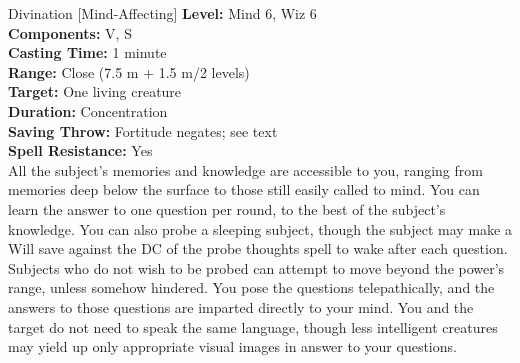 {Divination [Mind-Affecting]}
{
	\textbf{Level:} Mind 6, Wiz 6\\
	\textbf{Components:} V, S\\
	\textbf{Casting Time:} 1 minute\\
	\textbf{Range:} Close (7.5 m + 1.5 m/2 levels)\\
	\textbf{Target:} One living creature\\
	\textbf{Duration:} Concentration\\
	\textbf{Saving Throw:} Fortitude negates; see text\\
	\textbf{Spell Resistance:} Yes\\
}
{
	All the subject's memories and knowledge are accessible to you, ranging from memories deep below the surface to those still easily called to mind. You can learn the answer to one question per round, to the best of the subject's knowledge. You can also probe a sleeping subject, though the subject may make a Will save against the DC of the probe thoughts spell to wake after each question. Subjects who do not wish to be probed can attempt to move beyond the power's range, unless somehow hindered. You pose the questions telepathically, and the answers to those questions are imparted directly to your mind. You and the target do not need to speak the same language, though less intelligent creatures may yield up only appropriate visual images in answer to your questions.
}